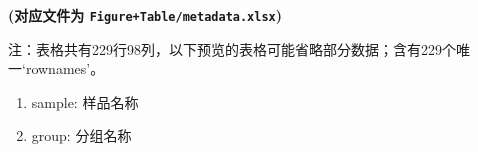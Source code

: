 \documentclass[
]{article}
\providecommand{\tightlist}{%
  \setlength{\itemsep}{0pt}\setlength{\parskip}{0pt}}
\begin{document}
\textbf{(对应文件为 \texttt{Figure+Table/metadata.xlsx})}

\begin{center}\begin{tcolorbox}[colback=gray!10, colframe=gray!50, width=0.9\linewidth, arc=1mm, boxrule=0.5pt]注：表格共有229行98列，以下预览的表格可能省略部分数据；含有229个唯一`rownames'。
\end{tcolorbox}
\end{center}
\begin{center}\begin{tcolorbox}[colback=gray!10, colframe=gray!50, width=0.9\linewidth, arc=1mm, boxrule=0.5pt]\begin{enumerate}\tightlist
\item sample:  样品名称
\item group:  分组名称
\end{enumerate}\end{tcolorbox}
\end{center}
\end{document}
